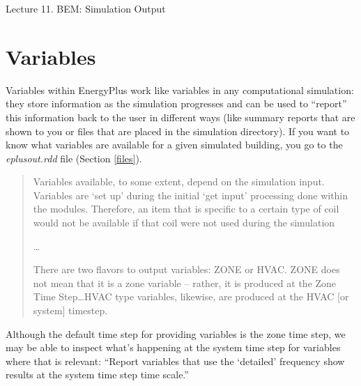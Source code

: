 \documentclass[10pt]{article}
\begin{document}
   \noindent
   \begin{center}

   \hrulefill
   
   \vspace{5pt}
   
   \vspace{0pt}
   
   {\Large \hfill  Lecture 11. BEM: Simulation Output}
   \vspace{5pt}
   
  
   \hrulefill
   \end{center}

   {}

\section{Variables}

Variables within EnergyPlus work like variables in any computational simulation: they store information as the simulation progresses and can be used to ``report'' this information back to the user in different ways (like summary reports that are shown to you or files that are placed in the simulation directory). If you want to know what variables are available for a given simulated building, you go to the \textit{eplusout.rdd} file (Section \ref{files}).

\begin{quote}
Variables available, to some extent, depend on the simulation input. Variables are `set up' during the initial `get input' processing done within the modules. Therefore, an item that is specific to a certain type of coil would not be available if that coil were not used during the simulation

\ldots

There are two flavors to output variables: ZONE or HVAC. ZONE does not mean that it is a zone variable -- rather, it is produced at the Zone Time Step\ldots HVAC type variables, likewise, are produced at the HVAC [or system] timestep. \cite{EP9docs}
\end{quote}


Although the default time step for providing variables is the zone time step, we may be able to inspect what's happening at the system time step for variables where that is relevant: ``Report variables that
use the `detailed' frequency show results at the system time step time scale.'' \cite{EPdocs9engineering}
\end{document}
